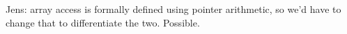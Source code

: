 \documentclass[acmsmall,review,screen]{acmart}\settopmatter{printfolios=true,printccs=false,printacmref=false}
\begin{document}
Jens: array access is formally defined using pointer arithmetic, so
we'd have to change that to differentiate the two.  Possible.




% 
% 
% 

% 
% 
% 
% 
% 
% 
% 
% 
% 
% 
% 
% 
% 
\end{document}
